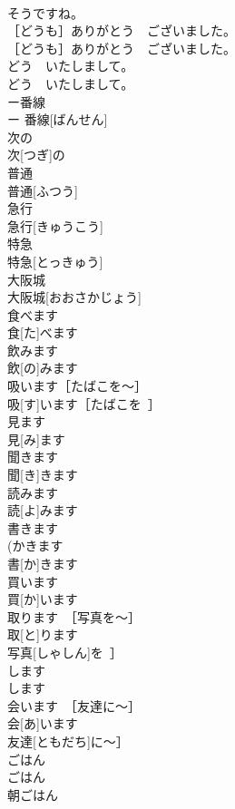 \documentclass[8pt]{extreport}
\begin{document}
\begin{CJK}{UTF8}{min}
\\	そうですね。	
\\	［どうも］ありがとう　ございました。	
\\	［どうも］ありがとう　ございました。	
\\	どう　いたしまして。	
\\	どう　いたしまして。	
\\	ー番線	
\\	ー 番線[ばんせん]	
\\	次の	
\\	次[つぎ]の	
\\	普通	
\\	普通[ふつう]	
\\	急行	
\\	急行[きゅうこう]	
\\	特急	
\\	特急[とっきゅう]	
\\	大阪城	
\\	大阪城[おおさかじょう]	
\\	食べます	
\\	食[た]べます	
\\	飲みます	
\\	飲[の]みます	
\\	吸います［たばこを～］	
\\	吸[す]います［たばこを~］	
\\	見ます	
\\	見[み]ます	
\\	聞きます	
\\	聞[き]きます	
\\	読みます	
\\	読[よ]みます	
\\	書きます	
\\	(かきます　
\\	書[か]きます	
\\	買います	
\\	買[か]います	
\\	取ります　［写真を～］	
\\	取[と]ります　
\\	写真[しゃしん]を~］	
\\	します	
\\	します	
\\	会います　［友達に〜］	
\\	会[あ]います　
\\	友達[ともだち]に〜］	
\\	ごはん	
\\	ごはん	
\\	朝ごはん	

\end{CJK}
\end{document}
